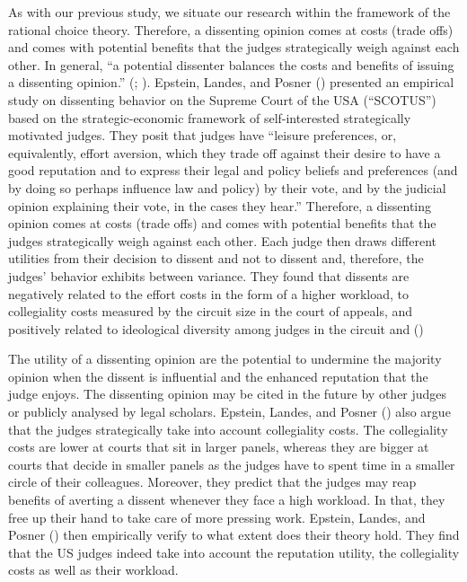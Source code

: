 \documentclass[
  11pt,
]{article}
\begin{document}
As with our previous study, we situate our research within the framework of the rational choice theory. Therefore, a dissenting opinion comes at costs (trade offs) and comes with potential benefits that the judges strategically weigh against each other. In general, ``a potential dissenter balances the costs and benefits of issuing a dissenting opinion.'' (; ). Epstein, Landes, and Posner () presented an empirical study on dissenting behavior on the Supreme Court of the USA (``SCOTUS'') based on the strategic-economic framework of self-interested strategically motivated judges. They posit that judges have ``leisure preferences, or, equivalently, effort aversion, which they trade off against their desire to have a good reputation and to express their legal and policy beliefs and preferences (and by doing so perhaps influence law and policy) by their vote, and by the judicial opinion explaining their vote, in the cases they hear.'' Therefore, a dissenting opinion comes at costs (trade offs) and comes with potential benefits that the judges strategically weigh against each other. Each judge then draws different utilities from their decision to dissent and not to dissent and, therefore, the judges' behavior exhibits between variance. They found that dissents are negatively related to the effort costs in the form of a higher workload, to collegiality costs measured by the circuit size in the court of appeals, and positively related to ideological diversity among judges in the circuit and ()

The utility of a dissenting opinion are the potential to undermine the majority opinion when the dissent is influential and the enhanced reputation that the judge enjoys. The dissenting opinion may be cited in the future by other judges or publicly analysed by legal scholars. Epstein, Landes, and Posner () also argue that the judges strategically take into account collegiality costs. The collegiality costs are lower at courts that sit in larger panels, whereas they are bigger at courts that decide in smaller panels as the judges have to spent time in a smaller circle of their colleagues. Moreover, they predict that the judges may reap benefits of averting a dissent whenever they face a high workload. In that, they free up their hand to take care of more pressing work. Epstein, Landes, and Posner () then empirically verify to what extent does their theory hold. They find that the US judges indeed take into account the reputation utility, the collegiality costs as well as their workload.
\end{document}
